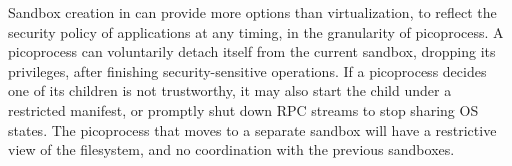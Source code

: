 

Sandbox creation in \graphene{} can provide
more options than virtualization, to reflect the security policy of applications at any timing,
in the granularity of picoprocess. 
A picoprocess can voluntarily detach itself from the current sandbox, dropping its privileges,
after finishing security-sensitive operations.
If a picoprocess decides one of its children is not trustworthy, it may also start the child under a restricted manifest,
or promptly shut down RPC streams to stop sharing OS states.
The picoprocess that moves to a separate sandbox will have a restrictive view of the filesystem, and no coordination with the previous sandboxes.



